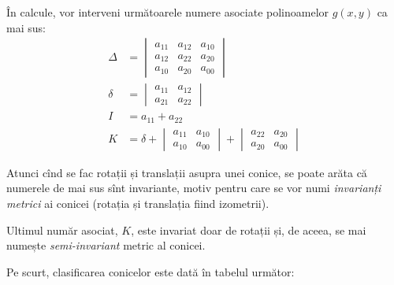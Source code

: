 În calcule, vor interveni următoarele numere asociate polinoamelor $g(x, y)$ ca
mai sus:
\begin{align*}
	\Delta &= \begin{vmatrix}
	              a_{11} & a_{12} & a_{10} \\
	              a_{12} & a_{22} & a_{20} \\
	              a_{10} & a_{20} & a_{00}
              \end{vmatrix} \\
    \delta &= \begin{vmatrix}
	              a_{11} & a_{12} \\
	              a_{21} & a_{22}
              \end{vmatrix} \\
    I &= a_{11} + a_{22} \\
    K &= \delta + \begin{vmatrix}
	                  a_{11} & a_{10} \\
	                  a_{10} & a_{00}
                  \end{vmatrix} + \begin{vmatrix}
	                                  a_{22} & a_{20} \\
	                                  a_{20} & a_{00}
                                  \end{vmatrix}
\end{align*}

\begin{remark}
	Atunci cînd se fac rotații și translații asupra unei conice, se poate arăta
că numerele de mai sus sînt invariante, motiv pentru care se vor numi 
\emph{invarianți metrici} ai conicei (rotația și translația fiind izometrii).

Ultimul număr asociat, $K$, este invariat doar de rotații și, de aceea, se mai
numește \emph{semi-invariant} metric al conicei.
\end{remark}

Pe scurt, clasificarea conicelor este dată în tabelul următor:

